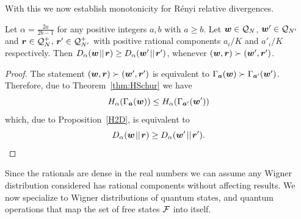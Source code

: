 \documentclass[pra,
aps,
twocolumn,
superscriptaddress,
groupedaddress,
nofootinbib,
reprint
]{revtex4-1}
\begin{document}
With this we now establish monotonicity for R\'{e}nyi relative divergences.
\begin{proposition}\label{DSchur}
	Let $\alpha = \frac{2a}{2b-1}$ for any positive integers $a,b$ with $a \geq b$. Let $\boldsymbol{w} \in \mathcal{Q}_N$, $\boldsymbol{w}' \in \mathcal{Q}_{N'}$ and $\boldsymbol{r} \in  \mathcal{Q}^+_N$, $\boldsymbol{r}' \in \mathcal{Q}^+_{N'}$ with positive rational components $a_i/K$ and $a'_i/K$ respectively.
	Then $D_\alpha(\boldsymbol{w} \hspace{1pt}||\hspace{1pt} \boldsymbol{r}) \geq D_\alpha(\boldsymbol{w}' \hspace{1pt}||\hspace{1pt} \boldsymbol{r}')$, whenever $(\boldsymbol{w}, \boldsymbol{r}) \succ (\boldsymbol{w}', \boldsymbol{r}')$.
\end{proposition}
\begin{proof}
	The statement $(\boldsymbol{w}, \boldsymbol{r}) \succ (\boldsymbol{w}', \boldsymbol{r}')$ is equivalent to $\Gamma_{\bm{a}}(\boldsymbol{w}) \succ \Gamma_{\bm{a}'}(\boldsymbol{w}')$.
	Therefore, due to Theorem~\ref{thm:HSchur} we have
	\begin{equation}
		H_\alpha(\Gamma_{\bm{a}}(\boldsymbol{w})) \leq H_\alpha(\Gamma_{\bm{a}'}(\boldsymbol{w}'))
	\end{equation}
	which, due to Proposition~\ref{H2D}, is equivalent to
	\begin{equation}
		D_\alpha(\boldsymbol{w} \hspace{1pt}||\hspace{1pt} \boldsymbol{r}) \geq D_\alpha(\boldsymbol{w}' \hspace{1pt}||\hspace{1pt} \boldsymbol{r}').
	\end{equation}
\end{proof}
Since the rationals are dense in the real numbers we can assume any Wigner distribution considered has rational components without affecting results.
We now specialize to Wigner distributions of quantum states, and quantum operations that map the set of free states ${\mathcal F}$ into itself.
\begingroup
\def\thetheorem{\ref{thm:Da_props}}
\end{document}
